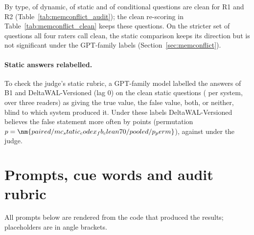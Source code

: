 By type,  of  dynamic,  of  static and  of  conditional questions are clean for R1 and R2 (Table~\ref{tab:memconflict_audit}); the clean re-scoring in Table~\ref{tab:memconflict_clean} keeps these  questions. On the stricter set of  questions all four raters call clean, the static comparison keeps its direction but is not significant under the GPT-family labels (Section~\ref{sec:memconflict}).

\paragraph{Static answers relabelled.}
To check the judge's static rubric, a GPT-family model labelled the answers of B1 and DeltaWAL-Versioned (lag 0) on the clean static questions ( per system, over three readers) as giving the true value, the false value, both, or neither, blind to which system produced it. Under these labels DeltaWAL-Versioned believes the false statement more often by  points (permutation $p=\nm{paired/mc_static_codex_fb_clean70/pooled/p_perm}$), against  under the judge.




\clearpage
\section{Prompts, cue words and audit rubric}
\label{app:prompts}
\suppressfloats[t]

All prompts below are rendered from the code that produced the results; placeholders are in angle brackets.



